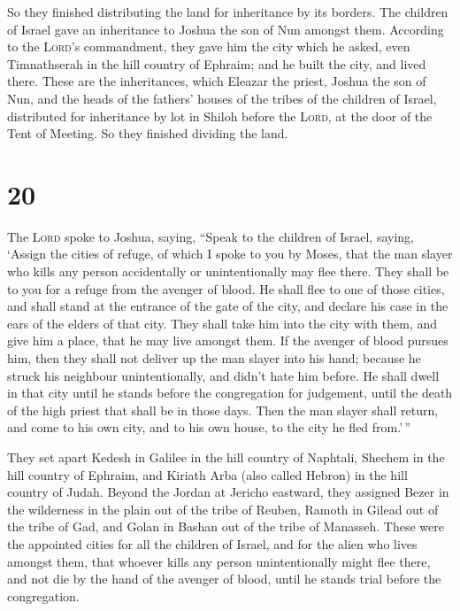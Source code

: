  So they finished distributing the land for inheritance
by its borders. The children of Israel gave an inheritance to Joshua the
son of Nun amongst them.  According to the
\textsc{Lord}'s commandment, they gave him the city which he asked, even
Timnathserah in the hill country of Ephraim; and he built the city, and
lived there.  These are the inheritances, which Eleazar
the priest, Joshua the son of Nun, and the heads of the fathers' houses
of the tribes of the children of Israel, distributed for inheritance by
lot in Shiloh before the \textsc{Lord}, at the door of the Tent of
Meeting. So they finished dividing the land.

\hypertarget{section-19}{%
\section{20}\label{section-19}}

 The \textsc{Lord} spoke to Joshua, saying, 
``Speak to the children of Israel, saying, `Assign the cities of refuge,
of which I spoke to you by Moses,  that the man slayer who
kills any person accidentally or unintentionally may flee there. They
shall be to you for a refuge from the avenger of blood. 
He shall flee to one of those cities, and shall stand at the entrance of
the gate of the city, and declare his case in the ears of the elders of
that city. They shall take him into the city with them, and give him a
place, that he may live amongst them.  If the avenger of
blood pursues him, then they shall not deliver up the man slayer into
his hand; because he struck his neighbour unintentionally, and didn't
hate him before.  He shall dwell in that city until he
stands before the congregation for judgement, until the death of the
high priest that shall be in those days. Then the man slayer shall
return, and come to his own city, and to his own house, to the city he
fled from.'\,''

 They set apart Kedesh in Galilee in the hill country of
Naphtali, Shechem in the hill country of Ephraim, and Kiriath Arba (also
called Hebron) in the hill country of Judah.  Beyond the
Jordan at Jericho eastward, they assigned Bezer in the wilderness in the
plain out of the tribe of Reuben, Ramoth in Gilead out of the tribe of
Gad, and Golan in Bashan out of the tribe of Manasseh. 
These were the appointed cities for all the children of Israel, and for
the alien who lives amongst them, that whoever kills any person
unintentionally might flee there, and not die by the hand of the avenger
of blood, until he stands trial before the congregation.

